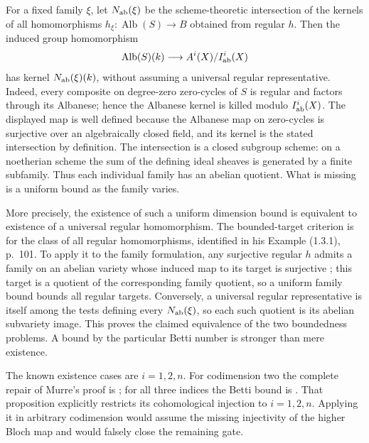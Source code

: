 For a fixed family $\xi$, let $N_{\rm ab}(\xi)$ be the
scheme-theoretic intersection of the kernels of all homomorphisms
$h_\xi:\operatorname{Alb}(S)\to B$ obtained from regular $h$.
Then the induced group homomorphism
\[
 \operatorname{Alb}(S)(k)\longrightarrow
                    A^i(X)/I^i_{\rm ab}(X)
\]
has kernel $N_{\rm ab}(\xi)(k)$, without assuming a universal
regular representative. Indeed, every composite on degree-zero
zero-cycles of $S$ is regular and factors through its Albanese;
hence the Albanese kernel is killed modulo $I^i_{\rm ab}(X)$.
The displayed map is well defined because the Albanese map on
zero-cycles is surjective over an algebraically closed field, and
its kernel is the stated intersection by definition. The
intersection is a closed subgroup scheme: on a noetherian
scheme the sum of the defining ideal sheaves is generated by a
finite subfamily. Thus each individual family has an abelian
quotient. What is missing is a uniform bound as the family varies.

More precisely, the existence of such a uniform dimension bound
is equivalent to existence of a universal regular homomorphism.
The bounded-target criterion is
\cite[Theorem 2.2(ii), p.~103 and proof pp.~103--106]{DGJ_Saito1979}
for the class of all regular homomorphisms, identified in his
Example (1.3.1), p.~101. To apply it to the family formulation,
any surjective regular $h$ admits a family on an abelian variety
whose induced map to its target is surjective
\cite[Proposition 1.2, pp.~98--100]{DGJ_Saito1979}; this target
is a quotient of the corresponding family quotient, so a uniform
family bound bounds all regular targets. Conversely, a universal
regular representative is itself among the tests defining every
$N_{\rm ab}(\xi)$, so each such quotient is its abelian
subvariety image. This proves the claimed equivalence of the two
boundedness problems. A bound by the particular Betti number is
stronger than mere existence.

The known existence cases are $i=1,2,n$.
For codimension two the complete repair of Murre's proof is
\cite[Theorem 1 and its two proofs, author version
pp.~2--4]{DGJ_Kahn2021}; for all three indices the Betti bound is
\cite[Proposition 8.2, p.~31]{DGJ_ACMVFunctor}.
That proposition explicitly restricts its cohomological injection
to $i=1,2,n$. Applying it in arbitrary codimension would assume
the missing injectivity of the higher Bloch map and would falsely
close the remaining gate.

